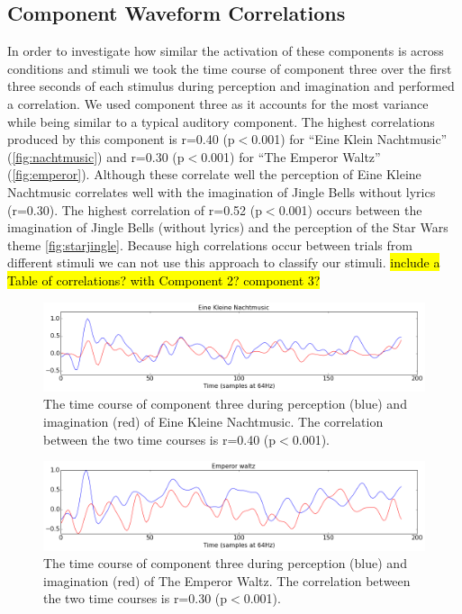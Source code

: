 \subsection*{Component Waveform Correlations}
In order to investigate how similar the activation of these components is across conditions and stimuli we took the time course of component three over the first three seconds of each stimulus during perception and imagination and performed a correlation.
We used component three as it accounts for the most variance while being similar to a typical auditory component.
The highest correlations produced by this component is r=0.40 (p$<$0.001) for ``Eine Klein Nachtmusic'' (\autoref{fig:nachtmusic}) and r=0.30 (p$<$0.001) for ``The Emperor Waltz'' (\autoref{fig:emperor}).
Although these correlate well the perception of Eine Kleine Nachtmusic correlates well with the imagination of Jingle Bells without lyrics (r=0.30). 
The highest correlation of r=0.52 (p$<$0.001) occurs between the imagination of Jingle Bells (without lyrics) and the perception of the Star Wars theme \autoref{fig:starjingle}. 
Because high correlations occur between trials from different stimuli we can not use this approach to classify our stimuli.
\hl{include a Table of correlations? with Component 2? component 3?}


\begin{figure}[t]
  \begin{center}
    \includegraphics[scale=0.4]{Figures/EineKleineCorrelation}
    \caption{
The time course of component three during perception (blue) and imagination (red) of Eine Kleine Nachtmusic. The correlation between the two time courses is r=0.40 (p$<$0.001).
}
    \label{fig:nachtmusic}
  \end{center}
\end{figure}

\begin{figure}[t]
  \begin{center}
    \includegraphics[scale=0.4]{Figures/EmperorCorrelation}
    \caption{
The time course of component three during perception (blue) and imagination (red) of The Emperor Waltz. The correlation between the two time courses is r=0.30 (p$<$0.001).
}
    \label{fig:emperor}
  \end{center}
\end{figure}


